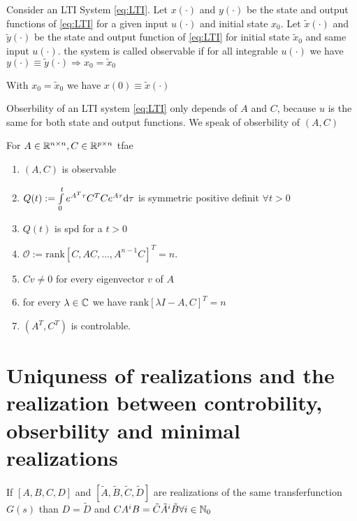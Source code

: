 \begin{defi}
	Consider an LTI System \eqref{eq:LTI}. Let $x(\cdot )$ and $y(\cdot)$ be the state and output functions of \eqref{eq:LTI} for a given input $u(\cdot)$ and initial state $x_0$. Let $\tilde{x}(\cdot)$ and $\tilde{y}(\cdot)$ be the state and output function of \eqref{eq:LTI} for initial state $\tilde{x}_0$ and same input $u(\cdot)$. the system is called observable if for all integrable $u(\cdot)$ we have $y(\cdot) \equiv \tilde{y}(\cdot) \Rightarrow x_0= \tilde{x}_0$  
\end{defi}

\begin{rem}
	With $x_0 = \tilde{x}_0$ we have $x(0) \equiv \tilde{x}(\cdot)$
\end{rem}

\begin{rem}
	Obserbility of an LTI system \eqref{eq:LTI} only depends of $A$ and $C$, because $u$ is the same for both state and output functions. We speak of obserbility of $(A,C)$
\end{rem}

\begin{thm}
	For $A \in \mathbb{R}^{n \times n}, C \in \mathbb{R}^{p \times n } $ tfae
	\begin{enumerate}
		\item $(A,C)$ is observable 
		\item $Q(t):=\int\limits_0^t e^{A^T \tau} C^T C e^{A \tau} \mathrm{d} \tau $ is symmetric positive definit $\forall t>0$
		\item $Q(t)$ is spd for a $t>0$
		\item $\mathcal{O}:= \text{rank} [C,AC, \dots, A^{n-1}C]^T=n$. 
		\item $Cv \neq 0$ for every eigenvector $v$ of $A$
		\item for every $\lambda \in \mathbb{C}$ we have $\text{rank}[\lambda I - A,C]^T=n$
		\item $(A^T,C^T)$ is controlable. 
	\end{enumerate}
\end{thm}

\section{Uniquness of realizations and the realization between controbility, obserbility and minimal realizations}

\begin{lem}
	If $[A,B,C,D]$ and $[\tilde{A}, \tilde{B}, \tilde{C}, \tilde{D}]$ are realizations of the same transferfunction $G(s)$ than $D= \tilde{D}$ and $CA^iB = \tilde{C} \tilde{A}^i \tilde{B} \forall i \in \mathbb{N}_0$  
\end{lem}

